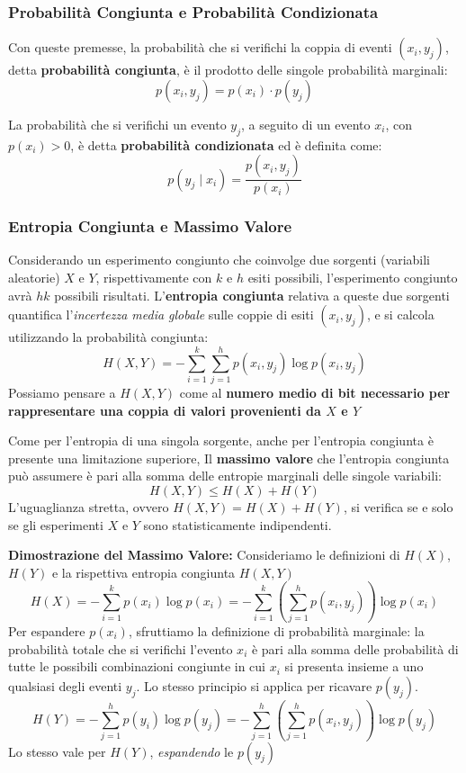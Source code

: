 \subsubsection*{Probabilità Congiunta e Probabilità Condizionata}
Con queste premesse, la probabilità che si verifichi la coppia di eventi $(x_i,y_j)$, detta \textbf{probabilità congiunta}, è il prodotto delle singole probabilità marginali:
$$p(x_i,y_j) = p(x_i)\cdot p(y_j)$$

La probabilità che si verifichi un evento $y_j$, a seguito di un evento $x_i$, con $p(x_i)>0$, è detta \textbf{probabilità condizionata} ed è definita come:
$$p(y_j\mid x_i)= \frac{p(x_i,y_j)}{p(x_i)}$$

\subsubsection{Entropia Congiunta e Massimo Valore}
Considerando un esperimento congiunto che coinvolge due sorgenti (variabili aleatorie) $X$ e $Y$, rispettivamente con $k$ e $h$ esiti possibili, l'esperimento congiunto avrà $hk$ possibili risultati. L'\textbf{entropia congiunta} relativa a queste due sorgenti quantifica l'\textit{incertezza media globale} sulle coppie di esiti $(x_i, y_j)$, e si calcola utilizzando la probabilità congiunta:
\[ H(X,Y) = - \sum_{i=1}^{k} \sum_{j=1}^{h} p(x_i, y_j) \log p(x_i, y_j) \]
Possiamo pensare a $H(X,Y)$ come al \textbf{numero medio di bit necessario per rappresentare una coppia di valori provenienti da $X$ e $Y$}

Come per l'entropia di una singola sorgente, anche per l'entropia congiunta è presente una limitazione superiore,
Il \textbf{massimo valore} che l'entropia congiunta può assumere è pari alla somma delle entropie marginali delle singole variabili:
\[ H(X,Y) \le H(X) + H(Y) \]
L'uguaglianza stretta, ovvero $H(X,Y) = H(X) + H(Y)$, si verifica se e solo se gli esperimenti $X$ e $Y$ sono statisticamente indipendenti.

\textbf{Dimostrazione del Massimo Valore:}
Consideriamo le definizioni di $H(X)$, $H(Y)$ e la rispettiva entropia congiunta $H(X,Y)$
$$H(X)= - \sum_{i=1}^k p(x_i)\log p(x_i)= -\sum_{i=1}^k\left( \sum_{j=1}^hp(x_i,y_j)\right) \log p(x_i)$$
Per espandere $p(x_i)$, sfruttiamo la definizione di probabilità marginale: la probabilità totale che si verifichi l'evento $x_i$ è pari alla somma delle probabilità di tutte le possibili combinazioni congiunte in cui $x_i$ si presenta insieme a uno qualsiasi degli eventi $y_j$. Lo stesso principio si applica per ricavare $p(y_j)$.
$$H(Y)= - \sum_{j=1}^h p(y_i)\log p(y_j)= -\sum_{j=1}^h\left( \sum_{j=1}^hp(x_i,y_j)\right) \log p(y_j)$$
Lo stesso vale per $H(Y)$, \textit{espandendo} le $p(y_j)$


